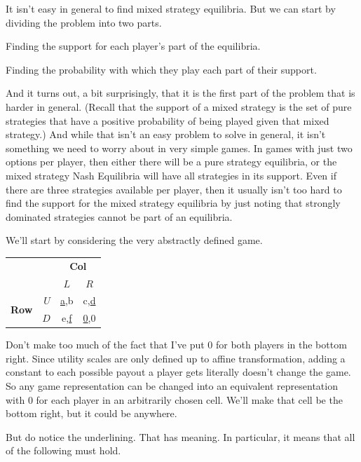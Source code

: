 \documentclass[openany]{book}
\begin{document}
It isn't easy in general to find mixed strategy equilibria. But we can start by dividing the problem into two parts.

\begin{enumerate*}
\item Finding the support for each player's part of the equilibria.
\item Finding the probability with which they play each part of their support.
\end{enumerate*}
And it turns out, a bit surprisingly, that it is the first part of the problem that is harder in general. (Recall that the support of a mixed strategy is the set of pure strategies that have a positive probability of being played given that mixed strategy.) And while that isn't an easy problem to solve in general, it isn't something we need to worry about in very simple games. In games with just two options per player, then either there will be a pure strategy equilibria, or the mixed strategy Nash Equilibria will have all strategies in its support. Even if there are three strategies available per player, then it usually isn't too hard to find the support for the mixed strategy equilibria by just noting that strongly dominated strategies cannot be part of an equilibria.

We'll start by considering the very abstractly defined game.

\begin{center}
\begin{tabular}{l r | c c}
& & \multicolumn{2}{c}{\textbf{Col}} \\
& & $L$ & $R$ \\ \hline
\multirow{2}{*}{\textbf{Row}} & $U$ & \underline{a},b & c,\underline{d} \\
& $D$ & e,\underline{f} & \underline{0},0
\end{tabular}
\end{center}
Don't make too much of the fact that I've put 0 for both players in the bottom right. Since utility scales are only defined up to affine transformation, adding a constant to each possible payout a player gets literally doesn't change the game. So any game representation can be changed into an equivalent representation with 0 for each player in an arbitrarily chosen cell. We'll make that cell be the bottom right, but it could be anywhere.

But do notice the underlining. That has meaning. In particular, it means that all of the following must hold.
\end{document}
